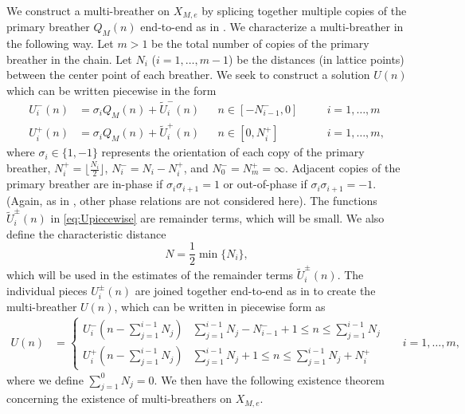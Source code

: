 \documentclass[12pt,reqno]{amsart}
\begin{document}
We construct a multi-breather on $X_{M,e}$ by splicing together multiple copies of the primary breather $Q_M(n)$ end-to-end as in \cites{Parker2020,Sandstede1998}. We characterize a multi-breather in the following way. Let $m > 1$ be the total number of copies of the primary breather in the chain. Let $N_i$ ($i = 1, \dots, m-1$) be the distances (in lattice points) between the center point of each breather. We seek to construct a solution $U(n)$ which can be written piecewise in the form
\begin{equation}\label{eq:Upiecewise}
\begin{aligned}
U_i^-(n) &= \sigma_i Q_M(n) + \tilde{U}_i^-(n) && n \in [-N_{i-1}^-, 0] && \quad i = 1, \dots, m\\
U_i^+(n) &= \sigma_i Q_M(n) + \tilde{U}_i^+(n) && n \in [0, N_i^+] && \quad i = 1, \dots, m,
\end{aligned}
\end{equation}
where $\sigma_i \in \{1, -1\}$ represents the orientation of each copy of the primary breather, $N_i^+ = \lfloor \frac{N_i}{2} \rfloor$, $N_i^- = N_i - N_i^+$, and $N_0^- = N_m^+ = \infty$. Adjacent copies of the primary breather are in-phase if $\sigma_i \sigma_{i+1} = 1$ or out-of-phase if $\sigma_i \sigma_{i+1} = -1$. (Again, as in \cite{Pelinovsky2012}, other phase relations are not considered here). The functions $\tilde{U}_i^\pm(n)$ in \cref{eq:Upiecewise} are remainder terms, which will be small. We also define the characteristic distance
\begin{equation}\label{defN}
N = \frac{1}{2} \min\{ N_i \},
\end{equation}
which will be used in the estimates of the remainder terms $\tilde{U}_i^\pm(n)$. The individual pieces $U_i^\pm(n)$ are joined together end-to-end as in \cites{Sandstede1998,Knobloch2000,Parker2020,Parker2021} to create the multi-breather $U(n)$, which can be written in piecewise form as
\begin{equation}
\begin{aligned}
U(n) &= \begin{cases}
U_i^-\left( n - \sum_{j=1}^{i-1}N_j \right) & \sum_{j=1}^{i-1}N_j - N_{i-1}^- + 1 \leq n \leq \sum_{j=1}^{i-1}N_j \\
U_i^+\left( n - \sum_{j=1}^{i-1}N_j \right) & \sum_{j=1}^{i-1}N_j + 1 \leq n \leq \sum_{j=1}^{i-1}N_j + N_i^+
\end{cases}
&& i = 1, \dots, m,
\end{aligned}
\end{equation}
where we define $\sum_{j=1}^0 N_j = 0$. We then have the following existence theorem concerning the existence of multi-breathers on $X_{M,e}$. 
\end{document}
